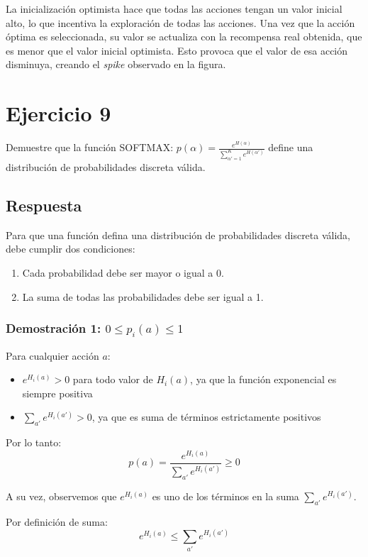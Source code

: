 \documentclass[12pt,a4paper]{article}
\begin{document}
La inicialización optimista hace que todas las acciones tengan un valor inicial
alto, lo que incentiva la exploración de todas las acciones. Una vez
que la acción óptima es seleccionada, su valor se actualiza con la recompensa
real obtenida, que es menor que el valor inicial optimista. Esto provoca
que el valor de esa acción disminuya, creando el \textit{spike}
observado en la figura.

\section{Ejercicio 9}

Demuestre que la función SOFTMAX: $p(\alpha) = \frac{e^{H(\alpha)}}{\sum_{\alpha'=1}^{K} e^{H(\alpha')}}$
define una distribución de probabilidades discreta válida.

\subsection{Respuesta}

Para que una función defina una distribución de probabilidades discreta válida,
debe cumplir dos condiciones:

\begin{enumerate}
    \item Cada probabilidad debe ser mayor o igual a 0.
    \item La suma de todas las probabilidades debe ser igual a 1.
\end{enumerate}

\subsubsection{Demostración 1: $0 \leq p_i(a) \leq 1$}

Para cualquier acción $a$:
\begin{itemize}
    \item $e^{H_i(a)} > 0$ para todo valor de $H_i(a)$, ya que la función exponencial es siempre positiva
    \item $\sum_{a'} e^{H_i(a')} > 0$, ya que es suma de términos estrictamente positivos
\end{itemize}

Por lo tanto:
$$p(a) = \frac{e^{H_i(a)}}{\sum_{a'} e^{H_i(a')}} \geq 0$$

A su vez, observemos que $e^{H_i(a)}$ es uno de los términos en la suma $\sum_{a'} e^{H_i(a')}$.

Por definición de suma:
$$e^{H_i(a)} \leq \sum_{a'} e^{H_i(a')}$$
\end{document}
